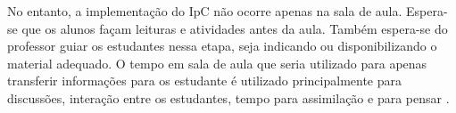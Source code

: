 \begin{figure}
\begin{centering}
    \par
  \end{centering}
\end{figure}

No entanto, a implementação do IpC não ocorre apenas na sala de aula. Espera-se
que os alunos façam leituras e atividades antes da aula. Também espera-se do
professor guiar os estudantes nessa etapa, seja indicando ou disponibilizando o
material adequado. O tempo em sala de aula que seria utilizado para apenas transferir
informações para os estudante é utilizado principalmente para discussões, interação
entre os estudantes, tempo para assimilação e para pensar \cite{Mazur2009, Crouch2001}.

